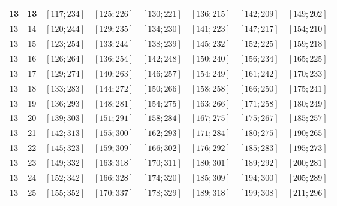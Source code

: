 \documentclass[a4paper,12pt]{article}
\begin{document}
\begin{center}
{\begin{longtable}[H]{|c|c|c|c|c|c|c|c|}
13 &  13 &  $\left[ 117; 234\right]$ &  $\left[ 125; 226\right]$ &  $\left[ 130; 221\right]$ &  $\left[ 136; 215\right]$ &  $\left[ 142; 209\right]$ &  $\left[ 149; 202\right]$ \tabularnewline \hline
13 &  14 &  $\left[ 120; 244\right]$ &  $\left[ 129; 235\right]$ &  $\left[ 134; 230\right]$ &  $\left[ 141; 223\right]$ &  $\left[ 147; 217\right]$ &  $\left[ 154; 210\right]$ \tabularnewline \hline
13 &  15 &  $\left[ 123; 254\right]$ &  $\left[ 133; 244\right]$ &  $\left[ 138; 239\right]$ &  $\left[ 145; 232\right]$ &  $\left[ 152; 225\right]$ &  $\left[ 159; 218\right]$ \tabularnewline \hline
13 &  16 &  $\left[ 126; 264\right]$ &  $\left[ 136; 254\right]$ &  $\left[ 142; 248\right]$ &  $\left[ 150; 240\right]$ &  $\left[ 156; 234\right]$ &  $\left[ 165; 225\right]$ \tabularnewline \hline
13 &  17 &  $\left[ 129; 274\right]$ &  $\left[ 140; 263\right]$ &  $\left[ 146; 257\right]$ &  $\left[ 154; 249\right]$ &  $\left[ 161; 242\right]$ &  $\left[ 170; 233\right]$ \tabularnewline \hline
13 &  18 &  $\left[ 133; 283\right]$ &  $\left[ 144; 272\right]$ &  $\left[ 150; 266\right]$ &  $\left[ 158; 258\right]$ &  $\left[ 166; 250\right]$ &  $\left[ 175; 241\right]$ \tabularnewline \hline
13 &  19 &  $\left[ 136; 293\right]$ &  $\left[ 148; 281\right]$ &  $\left[ 154; 275\right]$ &  $\left[ 163; 266\right]$ &  $\left[ 171; 258\right]$ &  $\left[ 180; 249\right]$ \tabularnewline \hline
13 &  20 &  $\left[ 139; 303\right]$ &  $\left[ 151; 291\right]$ &  $\left[ 158; 284\right]$ &  $\left[ 167; 275\right]$ &  $\left[ 175; 267\right]$ &  $\left[ 185; 257\right]$ \tabularnewline \hline
13 &  21 &  $\left[ 142; 313\right]$ &  $\left[ 155; 300\right]$ &  $\left[ 162; 293\right]$ &  $\left[ 171; 284\right]$ &  $\left[ 180; 275\right]$ &  $\left[ 190; 265\right]$ \tabularnewline \hline
13 &  22 &  $\left[ 145; 323\right]$ &  $\left[ 159; 309\right]$ &  $\left[ 166; 302\right]$ &  $\left[ 176; 292\right]$ &  $\left[ 185; 283\right]$ &  $\left[ 195; 273\right]$ \tabularnewline \hline
13 &  23 &  $\left[ 149; 332\right]$ &  $\left[ 163; 318\right]$ &  $\left[ 170; 311\right]$ &  $\left[ 180; 301\right]$ &  $\left[ 189; 292\right]$ &  $\left[ 200; 281\right]$ \tabularnewline \hline
13 &  24 &  $\left[ 152; 342\right]$ &  $\left[ 166; 328\right]$ &  $\left[ 174; 320\right]$ &  $\left[ 185; 309\right]$ &  $\left[ 194; 300\right]$ &  $\left[ 205; 289\right]$ \tabularnewline \hline
13 &  25 &  $\left[ 155; 352\right]$ &  $\left[ 170; 337\right]$ &  $\left[ 178; 329\right]$ &  $\left[ 189; 318\right]$ &  $\left[ 199; 308\right]$ &  $\left[ 211; 296\right]$ \tabularnewline \hline

\end{longtable}}
\end{center}
\end{document}
